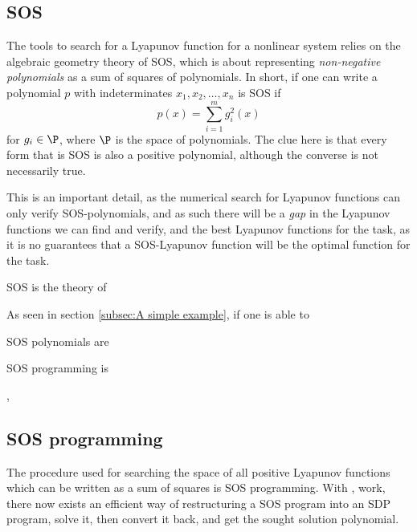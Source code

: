 \subsection{SOS}

The tools to search for a Lyapunov function for a nonlinear system relies on the
algebraic geometry theory of \ac{SOS}, which is about representing
\textit{non-negative polynomials} as a sum of squares of polynomials. In short,
if one can write a polynomial \(p\) with indeterminates \(x_1,x_2,\ldots,x_n\)
is \ac{SOS} if
\[
  p(x) = \sum_{i=1}^{m}g_i^2(x)
\]
for \(g_i \in \P\), where \(\P\) is the space of polynomials. The clue here is
that every form that is \ac{SOS} is also a positive polynomial, although the
converse is not necessarily true\cite{majumdarFunnelLibrariesRealtime2017}.

This is an important detail, as the numerical search for Lyapunov functions can
only verify \ac{SOS}-polynomials, and as such there will be a \textit{gap} in
the Lyapunov functions we can find and verify, and the best Lyapunov functions
for the task, as it is no guarantees that a \ac{SOS}-Lyapunov function will be
the optimal function for the task.

\ac{SOS} is the theory of

As seen in section \ref{subsec:A simple example}, if one is able to

\acl{SOS} polynomials are

\acl{SOS} programming is

\cite{parilloStructuredSemidefinitePrograms},

\subsection{SOS programming}

The procedure used for searching the space of all positive Lyapunov functions
which can be written as a sum of squares is \ac{SOS} programming. With
\cite[Parillo's]{parilloStructuredSemidefinitePrograms}, work, there now exists
an efficient way of restructuring a \ac{SOS} program into an \ac{SDP} program,
solve it, then convert it back, and get the sought solution polynomial.

